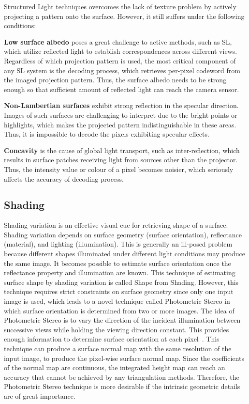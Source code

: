 Structured Light techniques overcomes the lack of texture problem by actively projecting a pattern onto the surface. However, it still suffers under the following conditions:

\textbf{Low surface albedo} poses a great challenge to active methods, such as SL, which utilize reflected light to establish correspondences across different views. Regardless of which projection pattern is used, the most critical component of any SL system is the decoding process, which retrieves per-pixel codeword from the imaged projection pattern. Thus, the surface albedo needs to be strong enough so that sufficient amount of reflected light can reach the camera sensor.

\textbf{Non-Lambertian surfaces} exhibit strong reflection in the specular direction. Images of such surfaces are challenging to interpret due to the bright points or highlights, which makes the projected pattern indistinguishable in these areas. Thus, it is impossible to decode the pixels exhibiting specular effects.

\textbf{Concavity} is the cause of global light transport, such as inter-reflection, which results in surface patches receiving light from sources other than the projector. Thus, the intensity value or colour of a pixel becomes noisier, which seriously affects the accuracy of decoding process.

\subsection{Shading}
Shading variation is an effective visual cue for retrieving shape of a surface. Shading variation depends on surface geometry (surface orientation), reflectance (material), and lighting (illumination). This is generally an ill-posed problem because different shapes illuminated under different light conditions may produce the same image. It becomes possible to estimate surface orientation once the reflectance property and illumination are known. This technique of estimating surface shape by shading variation is called Shape from Shading. However, this technique requires strict constraints on surface geometry since only one input image is used, which leads to a novel technique called Photometric Stereo in which surface orientation is determined from two or more images. The idea of Photometric Stereo is to vary the direction of the incident illumination between successive views while holding the viewing direction constant. This provides enough information to determine surface orientation at each pixel~\cite{woodham1979photometric}. This technique can produce a surface normal map with the same resolution of the input image, \ie to produce the pixel-wise surface normal map. Since the coefficients of the normal map are continuous, the integrated height map can reach an accuracy that cannot be achieved by any triangulation methods. Therefore, the Photometric Stereo technique is more desirable if the intrinsic geometric details are of great importance.

